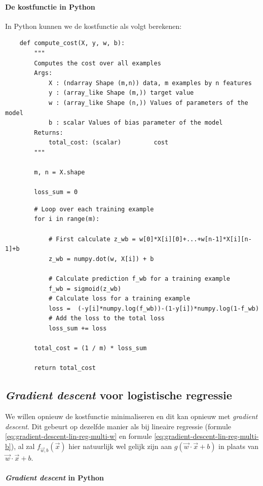 \paragraph{De kostfunctie in Python}
In Python kunnen we de kostfunctie als volgt berekenen:
\begin{lstlisting}
	def compute_cost(X, y, w, b):
	    """
	    Computes the cost over all examples
	    Args:
	        X : (ndarray Shape (m,n)) data, m examples by n features
	        y : (array_like Shape (m,)) target value 
	        w : (array_like Shape (n,)) Values of parameters of the model      
	        b : scalar Values of bias parameter of the model
	    Returns:
	        total_cost: (scalar)         cost 
	    """
	
	    m, n = X.shape
	
	    loss_sum = 0 
\end{lstlisting}
\newpage
\begin{lstlisting}	
	    # Loop over each training example
	    for i in range(m): 
	
	        # First calculate z_wb = w[0]*X[i][0]+...+w[n-1]*X[i][n-1]+b
	        z_wb = numpy.dot(w, X[i]) + b
	
	        # Calculate prediction f_wb for a training example
	        f_wb = sigmoid(z_wb)
	        # Calculate loss for a training example
	        loss =  (-y[i]*numpy.log(f_wb))-(1-y[i])*numpy.log(1-f_wb)
	        # Add the loss to the total loss
	        loss_sum += loss
	
	    total_cost = (1 / m) * loss_sum  
	
	    return total_cost
\end{lstlisting}

\subsection{\textit{Gradient descent} voor logistische regressie}

We willen opnieuw de kostfunctie minimaliseren en dit kan opnieuw met \textit{gradient descent}. Dit gebeurt op dezelfde manier als bij lineaire regressie (formule \ref{eq:gradient-descent-lin-reg-multi-w} en formule \ref{eq:gradient-descent-lin-reg-multi-b}), al zal $f_{\vec{w},b}(\vec{x})$ hier natuurlijk wel gelijk zijn aan $g(\vec{w} \cdot \vec{x} + b)$ in plaats van $\vec{w} \cdot \vec{x} + b$.

\paragraph{\textit{Gradient descent} in Python}

